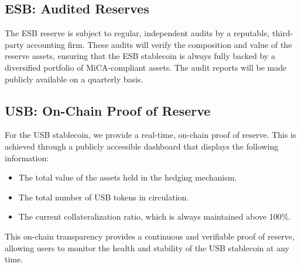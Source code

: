 \subsection{ESB: Audited Reserves}
The ESB reserve is subject to regular, independent audits by a reputable, third-party accounting firm. These audits will verify the composition and value of the reserve assets, ensuring that the ESB stablecoin is always fully backed by a diversified portfolio of MiCA-compliant assets. The audit reports will be made publicly available on a quarterly basis.

\subsection{USB: On-Chain Proof of Reserve}
For the USB stablecoin, we provide a real-time, on-chain proof of reserve. This is achieved through a publicly accessible dashboard that displays the following information:
\begin{itemize}
    \item The total value of the assets held in the hedging mechanism.
    \item The total number of USB tokens in circulation.
    \item The current collateralization ratio, which is always maintained above 100\%.
\end{itemize}

This on-chain transparency provides a continuous and verifiable proof of reserve, allowing users to monitor the health and stability of the USB stablecoin at any time.


